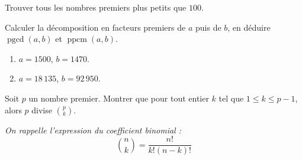 \documentclass[11pt,class=report,crop=false]{standalone}
\newcommand{\pgcd}{\mathop{\mathrm{pgcd}}\nolimits}
\newcommand{\ppcm}{\mathop{\mathrm{ppcm}}\nolimits}
\begin{document}
    




\bigskip
\bigskip




\exercice{}
\enonce
Trouver tous les nombres premiers plus petits que $100$.
\finenonce


\finexercice



\exercice{}
\enonce
Calculer la décomposition en facteurs premiers de $a$ puis de $b$, en déduire $\pgcd(a,b)$ et $\ppcm(a,b)$.
\begin{enumerate}
    \item $a=1500$, $b=1470$.
    \item $a=18\,135$, $b=92\,950$.
\end{enumerate}
\finenonce


\finexercice



\exercice{}
\enonce
Soit $p$ un nombre premier. Montrer que pour tout entier $k$ tel que $1 \leq k \leq p-1$, alors $p$ divise $\binom{p}{k}$.

\textit{On rappelle l'expression du coefficient binomial :}
$$ \binom{n}{k} = \frac{n!}{k!(n-k)!}$$
\finenonce


\finexercice
\end{document}
